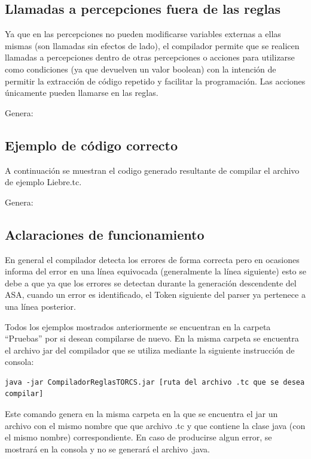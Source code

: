 \documentclass[11pt]{article}
\begin{document}
\subsection{Llamadas a percepciones fuera de las reglas}
Ya que en las percepciones no pueden modificarse variables externas a ellas mismas (son llamadas sin efectos de lado), el compilador
 permite que se realicen llamadas a percepciones dentro de otras percepciones o acciones para utilizarse como condiciones
 (ya que devuelven un valor boolean) con la intención de permitir la extracción de código repetido y facilitar la programación. Las acciones
 únicamente pueden llamarse en las reglas.



Genera:



\subsection{Ejemplo de código correcto}

A continuación se muestran el codigo generado resultante de compilar el archivo de ejemplo Liebre.tc.



Genera:




\subsection{Aclaraciones de funcionamiento}
En general el compilador detecta los errores de forma correcta pero en ocasiones informa del error en una línea equivocada
(generalmente la línea siguiente) esto se debe a que ya que los errores se detectan durante la generación descendente del ASA,
cuando un error es identificado, el Token siguiente del parser ya pertenece a una línea posterior.

Todos los ejemplos mostrados anteriormente se encuentran en la carpeta ``Pruebas'' por si desean compilarse de nuevo. En la misma carpeta
se encuentra el archivo jar del compilador que se utiliza mediante la siguiente instrucción de consola:

\begin{lstlisting}[style=J]
java -jar CompiladorReglasTORCS.jar [ruta del archivo .tc que se desea compilar]
\end{lstlisting}

Este comando genera en la misma carpeta en la que se encuentra el jar un archivo con el mismo nombre que que archivo .tc
y que contiene la clase java (con el mismo nombre) correspondiente. En caso de producirse algun error, se mostrará en la consola
y no se generará el archivo .java.
\end{document}
